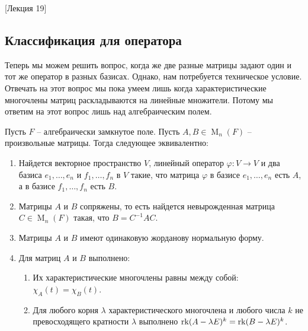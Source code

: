 [Лекция 19]


\subsection{Классификация для оператора}

Теперь мы можем решить вопрос, когда же две разные матрицы задают один и тот же оператор в разных базисах. Однако, нам потребуется техническое условие. Отвечать на этот вопрос мы пока умеем лишь когда характеристические многочлены матриц раскладываются на линейные множители. Потому мы ответим на этот вопрос лишь над алгебраическим полем.

\begin{claim}
Пусть $F$ -- алгебраически замкнутое поле. Пусть $A, B \in \operatorname{M}_n(F)$ -- произвольные матрицы. Тогда следующее эквивалентно:
\begin{enumerate}
\item Найдется векторное пространство $V$, линейный оператор $\varphi\colon V\to V$ и два базиса $e_1,\ldots,e_n$ и $f_1,\ldots,f_n$ в $V$ такие, что матрица $\varphi$ в базисе $e_1,\ldots,e_n$ есть $A$, а в базисе $f_1,\ldots,f_n$ есть $B$.

\item Матрицы $A$ и $B$ сопряжены, то есть найдется невырожденная матрица $C\in \operatorname{M}_n(F)$ такая, что $B = C^{-1} A C$.

\item Матрицы $A$ и $B$ имеют одинаковую жорданову нормальную форму.

\item Для матриц $A$ и $B$ выполнено:
\begin{enumerate}
\item Их характеристические многочлены равны между собой: $\chi_A(t) = \chi_B(t)$.
\item Для любого корня $\lambda$ характеристического многочлена и любого числа $k$ не превосходящего кратности $\lambda$ выполнено $\operatorname{rk} (A - \lambda E)^k = \operatorname{rk} (B - \lambda E)^k$.
\end{enumerate}
\end{enumerate}
\end{claim}
